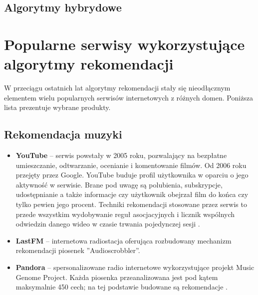 \documentclass[twoside]{iisthesis}
\begin{document}
	 \subsection{Algorytmy hybrydowe}
	 
	 \section{Popularne serwisy wykorzystujące algorytmy rekomendacji}
	 
		W przeciągu ostatnich lat algorytmy rekomendacji stały się nieodłącznym elementem wielu popularnych serwisów internetowych z różnych domen. Poniższa lista prezentuje wybrane produkty. 
	 
		 \subsection{Rekomendacja muzyki}
	 
		 \begin{itemize}
		 	\item \textbf{YouTube} -- serwis powstały w 2005 roku, pozwalający na bezpłatne umieszczanie, odtwarzanie, ocenianie i komentowanie filmów. Od 2006 roku przejęty przez Google. YouTube buduje profil użytkownika w oparciu o jego aktywność w serwisie. Brane pod uwagę są polubienia, subskrypcje, udostępnianie a także informacje czy użytkownik obejrzał film do końca czy tylko pewien jego procent. Techniki rekomendacji stosowane przez serwis to przede wszystkim wydobywanie reguł asocjacyjnych i licznik wspólnych odwiedzin danego wideo w czasie trwania pojedynczej sesji \cite{id:TheYouTubeVideoRecommendationSystem}. 
		 	\item \textbf{LastFM } -- internetowa radiostacja oferująca rozbudowany mechanizm rekomendacji piosenek ''Audioscrobbler''.   
		 	\item \textbf{Pandora}	-- spersonalizowane radio internetowe wykorzystujące projekt Music Genome Project. Każda piosenka przeanalizowana jest pod kątem maksymalnie 450 cech; na tej podstawie budowane są rekomendacje \cite{id:mgp}.
	
		 \end{itemize}
	 
\end{document}
